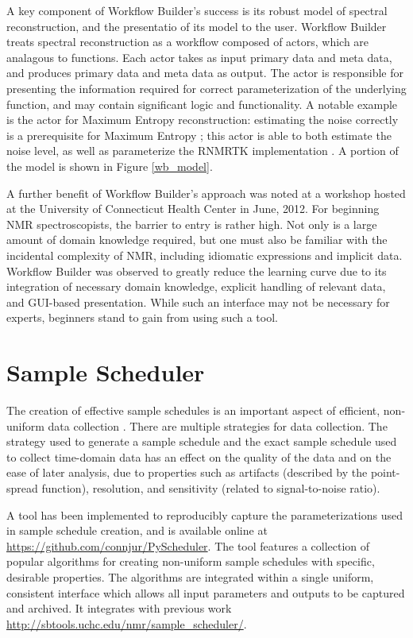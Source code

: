 A key component of Workflow Builder's success is its robust model of spectral
reconstruction, and the presentatio of its model to the user.  Workflow Builder
treats spectral reconstruction as a workflow composed of actors, which are
analagous to functions.  Each actor takes as input primary data and meta data,
and produces primary data and meta data as output.  The actor is responsible
for presenting the information required for correct parameterization of the
underlying function, and may contain significant logic and functionality.  A
notable example is the actor for Maximum Entropy reconstruction:  estimating
the noise correctly is a prerequisite for Maximum Entropy \cite{mobli2010non};
this actor is able to both estimate the noise level, as well as parameterize
the RNMRTK implementation \cite{rnmrtk}.  A portion of the model is shown
in Figure \ref{wb_model}.

A further benefit of Workflow Builder's approach was noted at a workshop
hosted at the University of Connecticut Health Center in June, 2012.  For
beginning NMR spectroscopists, the barrier to entry is rather high.  Not only
is a large amount of domain knowledge required, but one must also be familiar
with the incidental complexity of NMR, including idiomatic expressions and
implicit data.  Workflow Builder was observed to greatly reduce the learning
curve due to its integration of necessary domain knowledge, explicit handling
of relevant data, and GUI-based presentation.  While such an interface may 
not be necessary for experts, beginners stand to gain from using such a 
tool.



\section{Sample Scheduler}
The creation of effective sample schedules is an important aspect of efficient,
non-uniform data collection 
\cite{maciejewski2011random, rovnyak2004accelerated, mobli2010non}.  There
are multiple strategies for data collection.  The strategy used to generate
a sample schedule and the exact sample schedule used to collect time-domain
data has an effect on the quality of the data and on the ease of later 
analysis, due to properties such as artifacts (described by the point-spread
function), resolution, and sensitivity (related to signal-to-noise ratio).

A tool has been implemented to reproducibly capture the parameterizations
used in sample schedule creation, and is available online at
\url{https://github.com/connjur/PyScheduler}.  The tool features a 
collection of popular algorithms for creating non-uniform sample schedules
with specific, desirable properties.  The algorithms are integrated within
a single uniform, consistent interface which allows all input parameters
and outputs to be captured and archived.  It integrates with previous work
 \url{http://sbtools.uchc.edu/nmr/sample_scheduler/}.

